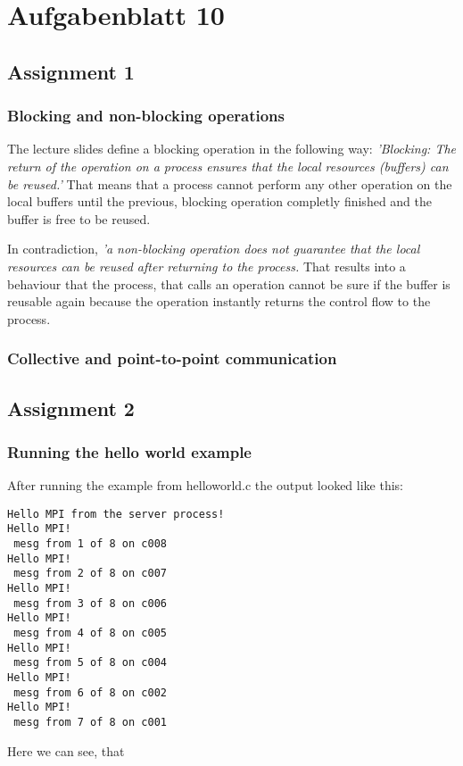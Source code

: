 \section{Aufgabenblatt 10}

\subsection{Assignment 1}
	\subsubsection{Blocking and non-blocking operations}
		The lecture slides define a blocking operation in the following way: 
		\textit{'Blocking: The return of the operation on a process ensures that the local resources (buffers) can be reused.'}
		That means that a process cannot perform any other operation on the local buffers until the previous, blocking operation completly finished and the buffer is free to be reused. 
		
		In contradiction, \textit{'a non-blocking operation does not guarantee that the local resources can be reused after returning to the process.} That results into a behaviour that the process, that calls an operation cannot be sure if the buffer is reusable again because the operation instantly returns the control flow to the process.
			
	\subsubsection{Collective and point-to-point communication}
				

	
\subsection{Assignment 2}
	\subsubsection{Running the hello world example}
After running the example from helloworld.c the output looked like this:
\begin{verbatim}
Hello MPI from the server process!
Hello MPI!
 mesg from 1 of 8 on c008
Hello MPI!
 mesg from 2 of 8 on c007
Hello MPI!
 mesg from 3 of 8 on c006
Hello MPI!
 mesg from 4 of 8 on c005
Hello MPI!
 mesg from 5 of 8 on c004
Hello MPI!
 mesg from 6 of 8 on c002
Hello MPI!
 mesg from 7 of 8 on c001
\end{verbatim}
Here we can see, that 

